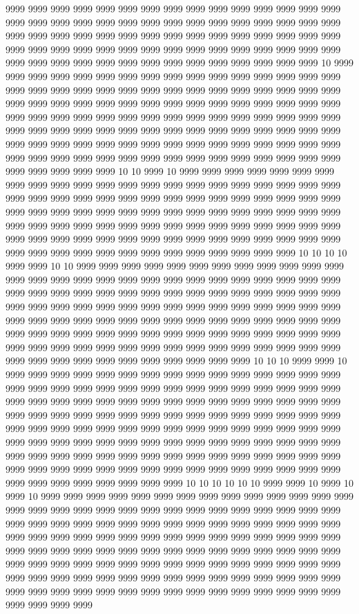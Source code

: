 9999 9999 9999 9999 9999 9999 9999 9999 9999 9999 9999 9999 9999 9999 9999 9999 9999 9999 9999 9999 9999 9999 9999 9999 9999 9999 9999 9999 9999 9999 9999 9999 9999 9999 9999 9999 9999 9999 9999 9999 9999 9999 9999 9999 9999 9999 9999 9999 9999 9999 9999 9999 9999 9999 9999 9999 9999 9999 9999 9999 9999 9999 9999 9999 9999 9999 9999 9999 9999 9999 9999 9999 9999 9999 10 9999 9999 9999 9999 9999 9999 9999 9999 9999 9999 9999 9999 9999 9999 9999 9999 9999 9999 9999 9999 9999 9999 9999 9999 9999 9999 9999 9999 9999 9999 9999 9999 9999 9999 9999 9999 9999 9999 9999 9999 9999 9999 9999 9999 9999 9999 9999 9999 9999 9999 9999 9999 9999 9999 9999 9999 9999 9999 9999 9999 9999 9999 9999 9999 9999 9999 9999 9999 9999 9999 9999 9999 9999 9999 9999 9999 9999 9999 9999 9999 9999 9999 9999 9999 9999 9999 9999 9999 9999 9999 9999 9999 9999 9999 9999 9999 9999 9999 9999 9999 9999 9999 9999 9999 9999 9999 9999 9999 9999 9999 9999 10 10 9999 10 9999 9999 9999 9999 9999 9999 9999 9999 9999 9999 9999 9999 9999 9999 9999 9999 9999 9999 9999 9999 9999 9999 9999 9999 9999 9999 9999 9999 9999 9999 9999 9999 9999 9999 9999 9999 9999 9999 9999 9999 9999 9999 9999 9999 9999 9999 9999 9999 9999 9999 9999 9999 9999 9999 9999 9999 9999 9999 9999 9999 9999 9999 9999 9999 9999 9999 9999 9999 9999 9999 9999 9999 9999 9999 9999 9999 9999 9999 9999 9999 9999 9999 9999 9999 9999 9999 9999 9999 9999 9999 9999 9999 9999 9999 9999 10 10 10 10 9999 9999 10 10 9999 9999 9999 9999 9999 9999 9999 9999 9999 9999 9999 9999 9999 9999 9999 9999 9999 9999 9999 9999 9999 9999 9999 9999 9999 9999 9999 9999 9999 9999 9999 9999 9999 9999 9999 9999 9999 9999 9999 9999 9999 9999 9999 9999 9999 9999 9999 9999 9999 9999 9999 9999 9999 9999 9999 9999 9999 9999 9999 9999 9999 9999 9999 9999 9999 9999 9999 9999 9999 9999 9999 9999 9999 9999 9999 9999 9999 9999 9999 9999 9999 9999 9999 9999 9999 9999 9999 9999 9999 9999 9999 9999 9999 9999 9999 9999 9999 9999 9999 9999 9999 9999 9999 9999 9999 9999 9999 9999 9999 9999 9999 9999 9999 10 10 10 9999 9999 10 9999 9999 9999 9999 9999 9999 9999 9999 9999 9999 9999 9999 9999 9999 9999 9999 9999 9999 9999 9999 9999 9999 9999 9999 9999 9999 9999 9999 9999 9999 9999 9999 9999 9999 9999 9999 9999 9999 9999 9999 9999 9999 9999 9999 9999 9999 9999 9999 9999 9999 9999 9999 9999 9999 9999 9999 9999 9999 9999 9999 9999 9999 9999 9999 9999 9999 9999 9999 9999 9999 9999 9999 9999 9999 9999 9999 9999 9999 9999 9999 9999 9999 9999 9999 9999 9999 9999 9999 9999 9999 9999 9999 9999 9999 9999 9999 9999 9999 9999 9999 9999 9999 9999 9999 9999 9999 9999 9999 9999 9999 9999 9999 9999 9999 9999 9999 9999 9999 9999 9999 9999 9999 9999 9999 9999 9999 9999 9999 10 10 10 10 10 10 9999 9999 10 9999 10 9999 10 9999 9999 9999 9999 9999 9999 9999 9999 9999 9999 9999 9999 9999 9999 9999 9999 9999 9999 9999 9999 9999 9999 9999 9999 9999 9999 9999 9999 9999 9999 9999 9999 9999 9999 9999 9999 9999 9999 9999 9999 9999 9999 9999 9999 9999 9999 9999 9999 9999 9999 9999 9999 9999 9999 9999 9999 9999 9999 9999 9999 9999 9999 9999 9999 9999 9999 9999 9999 9999 9999 9999 9999 9999 9999 9999 9999 9999 9999 9999 9999 9999 9999 9999 9999 9999 9999 9999 9999 9999 9999 9999 9999 9999 9999 9999 9999 9999 9999 9999 9999 9999 9999 9999 9999 9999 9999 9999 9999 9999 9999 9999 9999 9999 9999 9999 9999 9999 9999 9999 9999 9999 9999 9999 